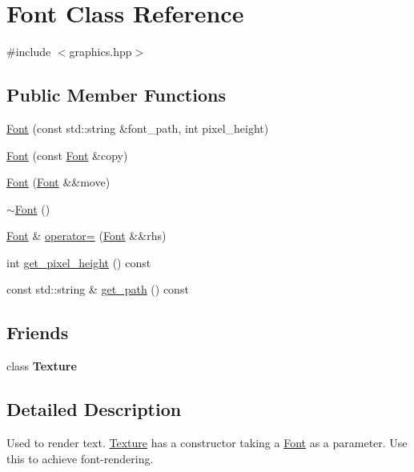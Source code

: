 \hypertarget{class_font}{}\section{Font Class Reference}
\label{class_font}


{\ttfamily \#include $<$graphics.\+hpp$>$}

\subsection*{Public Member Functions}
\begin{DoxyCompactItemize}
\item 
\mbox{\hyperlink{class_font_a42440c9f8cbae982974288d28d65816a}{Font}} (const std\+::string \&font\+\_\+path, int pixel\+\_\+height)
\item 
\mbox{\hyperlink{class_font_a90f63d6bc3c7813ec94906b2305d270e}{Font}} (const \mbox{\hyperlink{class_font}{Font}} \&copy)
\item 
\mbox{\hyperlink{class_font_ac7ae7201a9874e59f332e264885ec686}{Font}} (\mbox{\hyperlink{class_font}{Font}} \&\&move)
\item 
\mbox{\hyperlink{class_font_a134aaa2f78af0c12d3ce504957169768}{$\sim$\+Font}} ()
\item 
\mbox{\hyperlink{class_font}{Font}} \& \mbox{\hyperlink{class_font_afeea92cfdfe189b73a34f074482fe5dd}{operator=}} (\mbox{\hyperlink{class_font}{Font}} \&\&rhs)
\item 
int \mbox{\hyperlink{class_font_a8d59ee5734bff61e6de70de065d13260}{get\+\_\+pixel\+\_\+height}} () const
\item 
const std\+::string \& \mbox{\hyperlink{class_font_a891af996fb417492d9390620c957e5f3}{get\+\_\+path}} () const
\end{DoxyCompactItemize}
\subsection*{Friends}
\begin{DoxyCompactItemize}
\item 
\mbox{\label{class_font_af7f909106d08e36cd50aa58e36f9bf47}} 
class {\bfseries Texture}
\end{DoxyCompactItemize}


\subsection{Detailed Description}
Used to render text. \mbox{\hyperlink{class_texture}{Texture}} has a constructor taking a \mbox{\hyperlink{class_font}{Font}} as a parameter. Use this to achieve font-\/rendering. 

